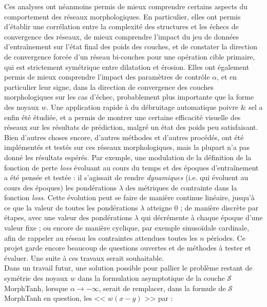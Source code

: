\vspace{-1.6mm}
\noindent Ces analyses ont néanmoins permis de mieux comprendre certains aspects du comportement des réseaux morphologiques. En particulier, elles ont permis d'établir une corrélation entre la complexité des structures et les échecs de convergence des réseaux, de mieux comprendre l'impact du jeu de données d'entraînement sur l'état final des poids des couches, et de constater la direction de convergence forcée d'un réseau bi-couches pour une opération cible primaire, qui est strictement symétrique entre dilatation et érosion. Elles ont également permis de mieux comprendre l'impact des paramètres de contrôle $\alpha$, et en particulier leur signe, dans la direction de convergence des couches morphologiques sur les cas d'échec, probablement plus importante que la forme des noyaux $w$. Une application rapide à du débruitage automatique poivre \& sel a enfin été étudiée, et a permis de montrer une certaine efficacité visuelle des réseaux sur les résultats de prédiction, malgré un état des poids peu satisfaisant. \\

\vspace{-1.0mm}
Bien d'autres choses encore, d'autres méthodes et d'autres procédés, ont été implémentés et testés sur ces réseaux morphologiques, mais la plupart n'a pas donné les résultats espérés. Par exemple, une modulation de la définition de la fonction de perte \textit{loss} évoluant au cours du temps et des époques d'entraînement a été pensée et testée : il s'agissait de rendre \textit{dynamiques} (i.e. qui évoluent au cours des époques) les pondérations $\lambda$ des métriques de contrainte dans la fonction \textit{loss}. Cette évolution peut se faire de manière continue linéaire, jusqu'à ce que la valeur de toutes les pondérations $\lambda$ atteigne 0 ; de manière discrète par étapes, avec une valeur des pondérations $\lambda$ qui décrémente à chaque époque d'une valeur fixe ; ou encore de manière cyclique, par exemple sinusoïdale cardinale, afin de rappeler au réseau les contraintes attendues toutes les $n$ périodes. Ce projet garde encore beaucoup de questions ouvertes et de méthodes à tester et évaluer. Une suite à ces travaux serait souhaitable. \\


Dans un travail futur, une solution possible pour pallier le problème restant de symétrie des noyaux $w$ dans la formulation asymptotique de la couche $\mathcal{S}$MorphTanh, lorsque $\alpha \rightarrow -\infty$, serait de remplacer, dans la formule de $\mathcal{S}$MorphTanh en question, les << $w(x-y)$ >> par :

